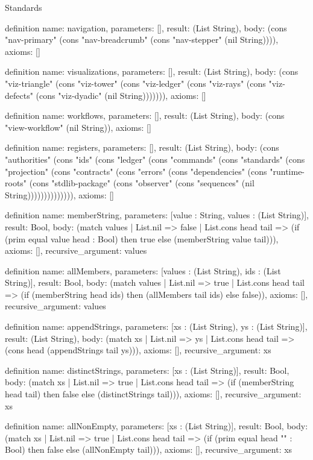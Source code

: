 \begin{lexlean}{Standards}
\begin{semanticmodule}
definition{
  name: navigation,
  parameters: [],
  result: (List String),
  body: (cons "nav-primary" (cons "nav-breadcrumb" (cons "nav-stepper" (nil String)))),
  axioms: []
}

definition{
  name: visualizations,
  parameters: [],
  result: (List String),
  body: (cons "viz-triangle" (cons "viz-tower" (cons "viz-ledger" (cons "viz-rays" (cons "viz-defects" (cons "viz-dyadic" (nil String))))))),
  axioms: []
}

definition{
  name: workflows,
  parameters: [],
  result: (List String),
  body: (cons "view-workflow" (nil String)),
  axioms: []
}

definition{
  name: registers,
  parameters: [],
  result: (List String),
  body: (cons "authorities" (cons "ids" (cons "ledger" (cons "commands" (cons "standards" (cons "projection" (cons "contracts" (cons "errors" (cons "dependencies" (cons "runtime-roots" (cons "stdlib-package" (cons "observer" (cons "sequences" (nil String)))))))))))))),
  axioms: []
}

definition{
  name: memberString,
  parameters: [value : String, values : (List String)],
  result: Bool,
  body: (match values
    | List.nil => false
    | List.cons head tail => (if (prim equal value head : Bool) then true else (memberString value tail))),
  axioms: [],
  recursive_argument: values
}

definition{
  name: allMembers,
  parameters: [values : (List String), ids : (List String)],
  result: Bool,
  body: (match values
    | List.nil => true
    | List.cons head tail => (if (memberString head ids) then (allMembers tail ids) else false)),
  axioms: [],
  recursive_argument: values
}

definition{
  name: appendStrings,
  parameters: [xs : (List String), ys : (List String)],
  result: (List String),
  body: (match xs
    | List.nil => ys
    | List.cons head tail => (cons head (appendStrings tail ys))),
  axioms: [],
  recursive_argument: xs
}

definition{
  name: distinctStrings,
  parameters: [xs : (List String)],
  result: Bool,
  body: (match xs
    | List.nil => true
    | List.cons head tail => (if (memberString head tail) then false else (distinctStrings tail))),
  axioms: [],
  recursive_argument: xs
}

definition{
  name: allNonEmpty,
  parameters: [xs : (List String)],
  result: Bool,
  body: (match xs
    | List.nil => true
    | List.cons head tail => (if (prim equal head "" : Bool) then false else (allNonEmpty tail))),
  axioms: [],
  recursive_argument: xs
}


\end{semanticmodule}
\end{lexlean}
